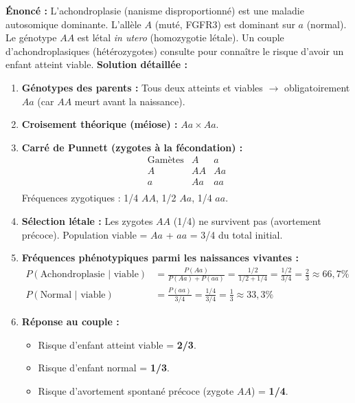 \documentclass[11pt]{article}
\begin{document}
\begin{exoresolu}
    \textbf{Énoncé :} L'achondroplasie (nanisme disproportionné) est une maladie autosomique dominante. L'allèle $A$ (muté, FGFR3) est dominant sur $a$ (normal). Le génotype $AA$ est létal \emph{in utero} (homozygotie létale). Un couple d'achondroplasiques (hétérozygotes) consulte pour connaître le risque d'avoir un enfant atteint viable.
    \tcblower
    \textbf{Solution détaillée :}
    \begin{enumerate}
        \item \textbf{Génotypes des parents :} Tous deux atteints et viables $\rightarrow$ obligatoirement \textbf{$Aa$} (car $AA$ meurt avant la naissance).
        \item \textbf{Croisement théorique (méiose) :} $Aa \times Aa$.
        \item \textbf{Carré de Punnett (zygotes à la fécondation) :}
              \[
              \begin{array}{c|cc}
              \text{Gamètes} & A & a \\ \hline
              A & AA & Aa \\
              a & Aa & aa \\
              \end{array}
              \]
              Fréquences zygotiques : 1/4 $AA$, 1/2 $Aa$, 1/4 $aa$.
        \item \textbf{Sélection létale :} Les zygotes $AA$ (1/4) ne survivent pas (avortement précoce). Population viable = $Aa$ + $aa$ = 3/4 du total initial.
        \item \textbf{Fréquences phénotypiques \textbf{parmi les naissances vivantes} :}
              \begin{align*}
                  P(\text{Achondroplasie } | \text{ viable}) &= \frac{P(Aa)}{P(Aa) + P(aa)} = \frac{1/2}{1/2 + 1/4} = \frac{1/2}{3/4} = \frac{2}{3} \approx 66,7\% \\
                  P(\text{Normal } | \text{ viable}) &= \frac{P(aa)}{3/4} = \frac{1/4}{3/4} = \frac{1}{3} \approx 33,3\%
              \end{align*}
        \item \textbf{Réponse au couple :} 
              \begin{itemize}
                  \item Risque d'enfant atteint viable = \textbf{2/3}.
                  \item Risque d'enfant normal = \textbf{1/3}.
                  \item Risque d'avortement spontané précoce (zygote $AA$) = \textbf{1/4}.

\end{itemize}
\end{enumerate}
\end{exoresolu}
\end{document}

